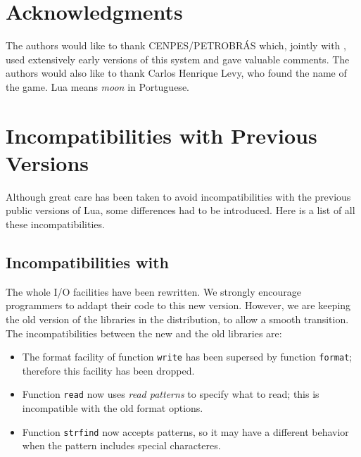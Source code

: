 \section*{Acknowledgments}

The authors would like to thank CENPES/PETROBR\'AS which,
jointly with \tecgraf, used extensively early versions of
this system and gave valuable comments.
The authors would also like to thank Carlos Henrique Levy,
who found the name of the game.
Lua means {\em moon} in Portuguese.



\appendix

\section*{Incompatibilities with Previous Versions}

Although great care has been taken to avoid incompatibilities with
the previous public versions of Lua,
some differences had to be introduced.
Here is a list of all these incompatibilities.

\subsection*{Incompatibilities with }
The whole I/O facilities have been rewritten.
We strongly encourage programmers to addapt their code
to this new version.
However, we are keeping the old version of the libraries
in the distribution,
to allow a smooth transition.
The incompatibilities between the new and the old libraries are:
\begin{itemize}
\item The format facility of function \verb'write' has been supersed by
function \verb'format';
therefore this facility has been dropped.
\item Function \verb'read' now uses {\em read patterns} to specify
what to read;
this is incompatible with the old format options.
\item Function \verb'strfind' now accepts patterns,
so it may have a different behavior when the pattern includes
special characteres.
\end{itemize}

